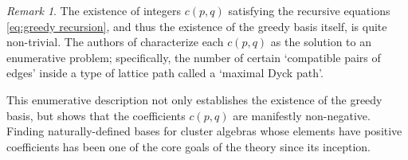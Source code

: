 \documentclass[11pt]{amsart}
\theoremstyle{remark}
\newtheorem{remark}[theorem]{Remark}
\numberwithin{equation}{section}
\begin{document}
\begin{remark}\label{rem:Dyck}
The existence of integers $c(p,q)$ satisfying the recursive equations \eqref{eq:greedy recursion}, and thus the existence of the greedy basis itself, is quite non-trivial.  The authors of \cite{LLZ} characterize each $c(p,q)$ as the solution to an enumerative problem; specifically, the number of certain `compatible pairs of edges' inside a type of lattice path called a `maximal Dyck path'.

This enumerative description not only establishes the existence of the greedy basis, but shows that the coefficients $c(p,q)$ are manifestly non-negative.  Finding naturally-defined bases for cluster algebras whose elements have positive coefficients has been one of the core goals of the theory since its inception.  %
\end{remark}

\end{document}
